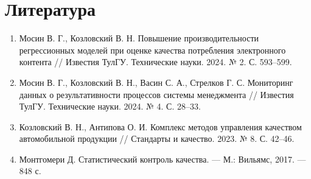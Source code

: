 \documentclass[a4paper,12pt]{article}
\begin{document}
	\section{Литература}
	\begin{enumerate}
		\item Мосин В. Г., Козловский В. Н. Повышение производительности регрессионных моделей при оценке качества потребления электронного контента // Известия ТулГУ. Технические науки. 2024. № 2. С. 593--599.
		\item Мосин В. Г., Козловский В. Н., Васин С. А., Стрелков Г. С. Мониторинг данных о результативности процессов системы менеджмента // Известия ТулГУ. Технические науки. 2024. № 4. С. 28--33.
		\item Козловский В. Н., Антипова О. И. Комплекс методов управления качеством автомобильной продукции // Стандарты и качество. 2023. № 8. С. 42--46.
		\item Монтгомери Д. Статистический контроль качества. — М.: Вильямс, 2017. — 848 с.
	\end{enumerate}
\end{document}
